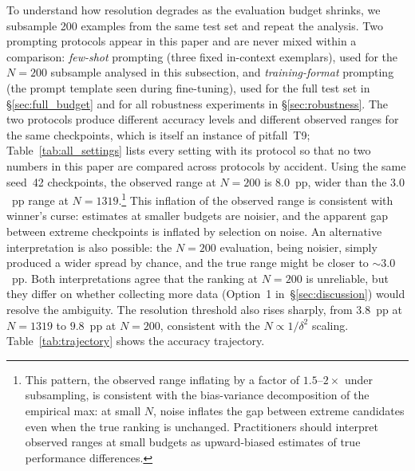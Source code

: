 \documentclass[pdflatex,sn-mathphys-ay,iicol]{sn-jnl}
\theoremstyle{thmstylethree}
\begin{document}
To understand how resolution degrades as the evaluation budget shrinks, we subsample 200 examples from the same test set and repeat the analysis. Two prompting protocols appear in this paper and are never mixed within a comparison: \emph{few-shot} prompting (three fixed in-context exemplars), used for the $N=200$ subsample analysed in this subsection, and \emph{training-format} prompting (the prompt template seen during fine-tuning), used for the full test set in \S\ref{sec:full_budget} and for all robustness experiments in \S\ref{sec:robustness}. The two protocols produce different accuracy levels and different observed ranges for the same checkpoints, which is itself an instance of pitfall~T9; Table~\ref{tab:all_settings} lists every setting with its protocol so that no two numbers in this paper are compared across protocols by accident. Using the same seed~42 checkpoints, the observed range at $N=200$ is $8.0$~pp, wider than the $3.0$~pp range at $N=1319$.\footnote{This pattern, the observed range inflating by a factor of $1.5$--$2\times$ under subsampling, is consistent with the bias-variance decomposition of the empirical max: at small $N$, noise inflates the gap between extreme candidates even when the true ranking is unchanged. Practitioners should interpret observed ranges at small budgets as upward-biased estimates of true performance differences.} This inflation of the observed range is consistent with winner's curse: estimates at smaller budgets are noisier, and the apparent gap between extreme checkpoints is inflated by selection on noise. An alternative interpretation is also possible: the $N=200$ evaluation, being noisier, simply produced a wider spread by chance, and the true range might be closer to $\sim3.0$~pp. Both interpretations agree that the ranking at $N=200$ is unreliable, but they differ on whether collecting more data (Option~1 in~\S\ref{sec:discussion}) would resolve the ambiguity. The resolution threshold also rises sharply, from $3.8$~pp at $N=1319$ to $9.8$~pp at $N=200$, consistent with the $N\propto 1/\delta^2$ scaling. Table~\ref{tab:trajectory} shows the accuracy trajectory.
\end{document}

